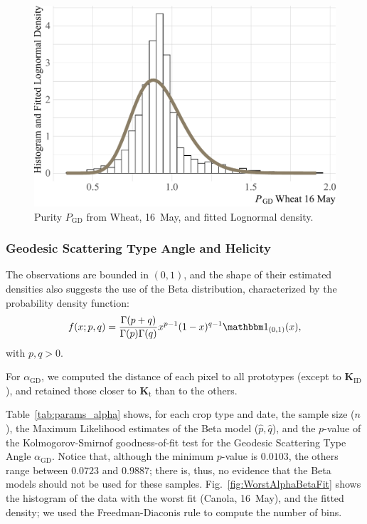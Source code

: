 \documentclass[journal]{IEEEtran}
\begin{document}
\begin{figure}[hbt]
	\centering
	\includegraphics[width=\linewidth]{WheatPurityLognormalFit}
	\caption{Purity $P_{\text{GD}}$ from Wheat, 16~May, and fitted Lognormal density.}\label{fig:WorstPurityLognormalFit}
\end{figure}



\subsubsection{Geodesic Scattering Type Angle and Helicity}

The observations are bounded in $(0,1)$, 
and the shape of their estimated densities also suggests the use of the Beta distribution, characterized by the probability density function:
\begin{equation}
f(x; p, q) = \frac{\Gamma(p+q)}{\Gamma(p)\Gamma(q)} x^{p-1} (1-x)^{q-1} \mathbbm 1_{(0,1)}(x),
\label{eq:BetaDensity}
\end{equation}
with $p,q>0$.

For $\alpha_{\text{GD}}$, we computed the distance of each pixel to all prototypes (except to $\bm K_{\text{ID}}$), and retained those closer to $\bm K_{\text{t}}$ than to the others.

Table~\ref{tab:params_alpha} shows, for each crop type and date, 
the sample size ($n$), 
the Maximum Likelihood estimates of the Beta model ($\widehat p,\widehat q$), and the $p$-value of the Kolmogorov-Smirnof goodness-of-fit test for the Geodesic Scattering Type Angle $\alpha_{\text{GD}}$.
Notice that, although the minimum $p$-value is $0.0103$, the others range between $0.0723$ and $0.9887$; there is, thus, no evidence that the Beta models should not be used for these samples.
Fig.~\ref{fig:WorstAlphaBetaFit} shows the histogram of the data with the worst fit (Canola, 16~May), and the fitted density; we used the Freedman-Diaconis rule to compute the number of bins.
\end{document}
